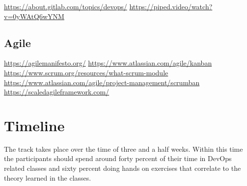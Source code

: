 \documentclass{article}
\begin{document}
\url{https://about.gitlab.com/topics/devops/}
\url{https://piped.video/watch?v=0yWAtQ6wYNM}

\subsection{Agile}

\url{https://agilemanifesto.org/}
\url{https://www.atlassian.com/agile/kanban}
\url{https://www.scrum.org/resources/what-scrum-module}
\url{https://www.atlassian.com/agile/project-management/scrumban}
\url{https://scaledagileframework.com/}

\newpage

\section{Timeline}

The track takes place over the time of three and a half weeks. Within this time
the participants should spend around forty percent of their time in DevOps
related classes and sixty percent doing hands on exercises that correlate to the
theory learned in the classes.
\end{document}
